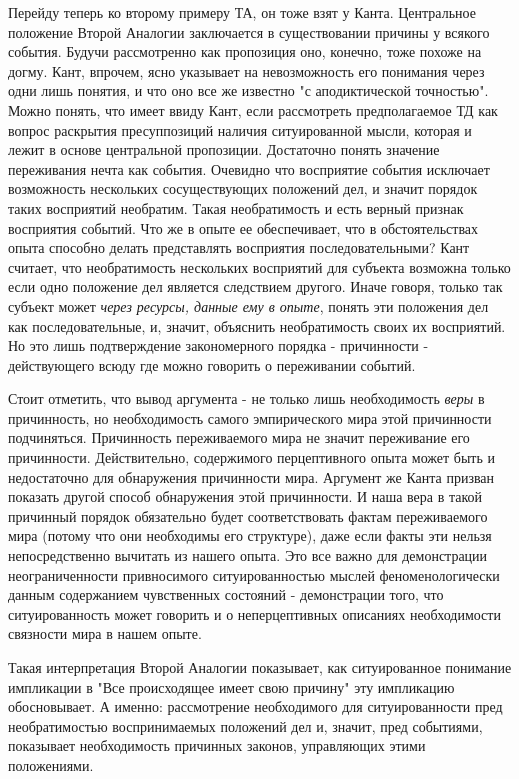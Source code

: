 \documentclass{article}
\begin{document}
Перейду теперь ко второму примеру ТА, он тоже взят у Канта. Центральное положение Второй Аналогии заключается в существовании причины у всякого события. Будучи рассмотренно как пропозиция оно, конечно, тоже похоже на догму. Кант, впрочем, ясно указывает на невозможность его понимания через одни лишь понятия, и что оно все же известно "с аподиктической точностью". Можно понять, что имеет ввиду Кант, если рассмотреть предполагаемое ТД как вопрос раскрытия пресуппозиций наличия ситуированной мысли, которая и лежит в основе центральной пропозиции. Достаточно понять значение переживания нечта как события. Очевидно что восприятие события исключает возможность нескольких сосуществующих положений дел, и значит порядок таких восприятий необратим. Такая необратимость и есть верный признак восприятия событий. Что же в опыте ее обеспечивает, что в обстоятельствах опыта способно делать представлять восприятия последовательными? Кант считает, что необратимость нескольких восприятий для субъекта возможна только если одно положение дел является следствием другого. Иначе говоря, только так субъект может \textit{через ресурсы, данные ему в опыте}, понять эти положения дел как последовательные, и, значит, объяснить необратимость своих их восприятий. Но это лишь подтверждение закономерного порядка - причинности - действующего всюду где можно говорить о переживании событий.

Стоит отметить, что вывод аргумента - не только лишь необходимость \textit{веры} в причинность, но необходимость самого эмпирического мира этой причинности подчиняться. Причинность переживаемого мира не значит переживание его причинности. Действительно, содержимого перцептивного опыта может быть и недостаточно для обнаружения причинности мира. Аргумент же Канта призван показать другой способ обнаружения этой причинности. И наша вера в такой причинный порядок обязательно будет соответствовать фактам переживаемого мира (потому что они необходимы его структуре), даже если факты эти нельзя непосредственно вычитать из нашего опыта. Это все важно для демонстрации неограниченности привносимого ситуированностью мыслей феноменологически данным содержанием чувственных состояний - демонстрации того, что ситуированность может говорить и о неперцептивных описаниях необходимости связности мира в нашем опыте.

Такая интерпретация Второй Аналогии показывает, как ситуированное понимание импликации в "Все происходящее имеет свою причину" эту импликацию обосновывает. А именно: рассмотрение необходимого для ситуированности пред необратимостью воспринимаемых положений дел и, значит, пред событиями, показывает необходимость причинных законов, управляющих этими положениями.
\end{document}
